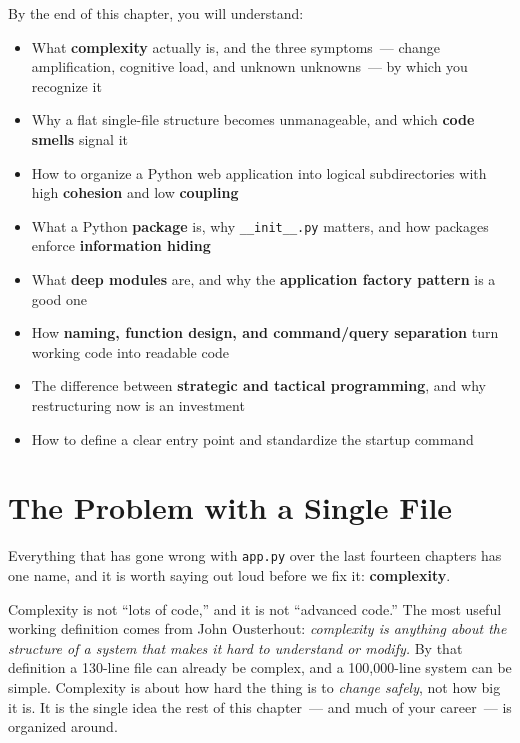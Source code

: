 \begin{objectives}

By the end of this chapter, you will understand:

\begin{itemize}
\tightlist
\item
  What \textbf{complexity} actually is, and the three symptoms~--- change amplification, cognitive load, and unknown unknowns~--- by which you recognize it
\item
  Why a flat single-file structure becomes unmanageable, and which \textbf{code smells} signal it
\item
  How to organize a Python web application into logical subdirectories with high \textbf{cohesion} and low \textbf{coupling}
\item
  What a Python \textbf{package} is, why \texttt{\_\_init\_\_.py} matters, and how packages enforce \textbf{information hiding}
\item
  What \textbf{deep modules} are, and why the \textbf{application factory pattern} is a good one
\item
  How \textbf{naming, function design, and command/query separation} turn working code into readable code
\item
  The difference between \textbf{strategic and tactical programming}, and why restructuring now is an investment
\item
  How to define a clear entry point and standardize the startup command
\end{itemize}

\end{objectives}

\setcounter{section}{0}
\section{The Problem with a Single File}\label{15-structuring-the-application:151-the-problem-with-a-single-file}

Everything that has gone wrong with \texttt{app.py} over the last fourteen chapters has one name, and it is worth saying out loud before we fix it: \textbf{complexity}.

Complexity is not ``lots of code,'' and it is not ``advanced code.'' The most useful working definition comes from John Ousterhout: \emph{complexity is anything about the structure of a system that makes it hard to understand or modify.} By that definition a 130-line file can already be complex, and a 100,000-line system can be simple. Complexity is about how hard the thing is to \emph{change safely}, not how big it is. It is the single idea the rest of this chapter~--- and much of your career~--- is organized around.

